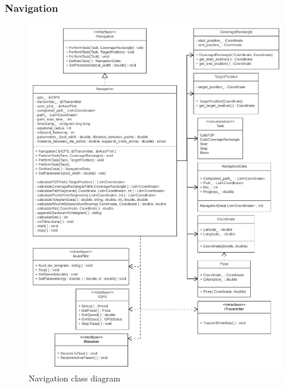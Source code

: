 \subsubsection{Navigation}

\begin{figure}[H]
\centering
\includegraphics[width=1.2\linewidth]{Images/Design/Navigation_class_diagram}
\caption{Navigation class diagram}
\label{fig:Navigation}
\end{figure}

